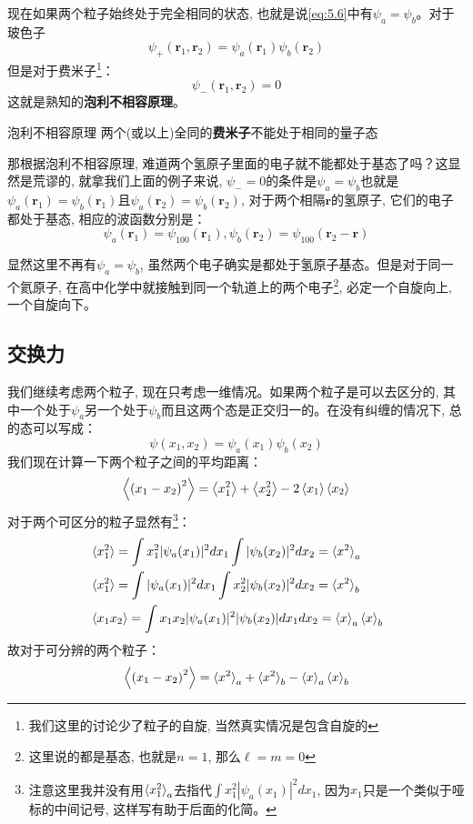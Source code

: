 \documentclass[a4paper,zihao=-4,linespread=1]{ctexrep}
\begin{document}
    现在如果两个粒子始终处于完全相同的状态, 也就是说\ref{eq:5.6}中有$\psi_a=\psi_b$。对于玻色子
    \[\psi_+(\mathbf{r}_1,\mathbf{r}_2)=\psi_a(\mathbf{r}_1)\psi_b(\mathbf{r}_2)\]
    但是对于费米子\footnote{我们这里的讨论少了粒子的自旋, 当然真实情况是包含自旋的}：
    \[\psi_-(\mathbf{r}_1,\mathbf{r}_2)=0\]
    这就是熟知的\textbf{泡利不相容原理}。
    \begin{theorem}{泡利不相容原理}
        两个(或以上)全同的\textbf{费米子}不能处于相同的量子态
    \end{theorem}
    那根据泡利不相容原理, 难道两个氢原子里面的电子就不能都处于基态了吗？这显然是荒谬的, 就拿我们上面的例子来说, $\psi_-=0$的条件是$\psi_a=\psi_b$也就是
    $\psi_a(\mathbf{r}_1)=\psi_b(\mathbf{r}_1)$且$\psi_a(\mathbf{r}_2)=\psi_b(\mathbf{r}_2)$, 对于两个相隔$\mathbf{r}$的氢原子, 它们的电子都处于基态, 相应的波函数分别是：
    \[\psi_a(\mathbf{r}_1)=\psi_{100}(\mathbf{r}_1), \psi_b(\mathbf{r}_2)=\psi_{100}(\mathbf{r}_2-\mathbf{r})\]
    
    显然这里不再有$\psi_a=\psi_b$, 虽然两个电子确实是都处于氢原子基态。但是对于同一个氦原子, 在高中化学中就接触到同一个轨道上的两个电子\footnote{这里说的都是基态, 也就是$n=1$, 那么$\ell=m=0$}, 必定一个自旋向上, 一个自旋向下。
    \subsection{交换力}
    我们继续考虑两个粒子, 现在只考虑一维情况。如果两个粒子是可以去区分的, 其中一个处于$\psi_a$另一个处于$\psi_b$而且这两个态是正交归一的。在没有纠缠的情况下, 总的态可以写成：
    \[\psi(x_1,x_2)=\psi_a(x_1)\psi_b(x_2)\]
    我们现在计算一下两个粒子之间的平均距离：
    \[\Braket{\left(x_1-x_2\right)^2}=\Braket{x_1^2}+\Braket{x_2^2}-2\Braket{x_1}\Braket{x_2}\]
    对于两个可区分的粒子显然有\footnote{注意这里我并没有用$\braket{x_1^2}_a$去指代$\int x_1^2|\psi_a(x_1)|^2dx_1$, 因为$x_1$只是一个类似于哑标的中间记号, 这样写有助于后面的化简。}：
    \begin{align*}
        &\braket{x_1^2}=\int x_1^2|\psi_a(x_1)|^2dx_1\int |\psi_b(x_2)|^2dx_2=\braket{x^2}_a\\
        &\braket{x_1^2}=\int |\psi_a(x_1)|^2dx_1\int x_2^2 |\psi_b(x_2)|^2dx_2=\braket{x^2}_b\\
        &\braket{x_1x_2}=\int x_1x_2|\psi_a(x_1)|^2|\psi_b(x_2)|dx_1dx_2=\braket{x}_a\braket{x}_b
    \end{align*}
    故对于可分辨的两个粒子：
    \begin{equation}
        \label{eq:5.7}
        \Braket{\left(x_1-x_2\right)^2}=\braket{x^2}_a+\braket{x^2}_b-\braket{x}_a\braket{x}_b
    \end{equation}
    
\end{document}
